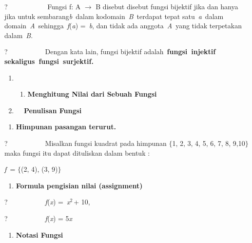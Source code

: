 \documentclass[11pt,fleqn]{book} %
\begin{document}
\noindent 

\noindent ?~~~~~~~~~~~ Fungsi f: A $\mathrm{\to}$ B disebut disebut fungsi bijektif jika dan hanya jika untuk sembarang\textit{b}~dalam kodomain~\textit{B}~terdapat tepat satu~\textit{a}~dalam domain~\textit{A}~sehingga~\textit{f}(\textit{a}) =~\textit{b}, dan tidak ada anggota~\textit{A}~yang tidak terpetakan dalam~\textit{B}.

\noindent ?~~~~~~~~~~~Dengan kata lain, fungsi bijektif adalah~\textbf{fungsi~injektif sekaligus~fungsi~surjektif.}

\noindent \textbf{}

\noindent \textbf{}

\begin{enumerate}
\item \begin{enumerate}
\item \textbf{ Menghitung Nilai dari Sebuah Fungsi}
\end{enumerate}

\item \textbf{ ~~Penulisan Fungsi}
\end{enumerate}

\noindent \textbf{}

\begin{enumerate}
\item \textbf{ Himpunan pasangan terurut.}
\end{enumerate}

\noindent 

\noindent ?~~~~~~~~~~~Misalkan fungsi kuadrat pada himpunan $\{$1, 2, 3, 4, 5, 6, 7, 8, 9,10$\}$ maka fungsi itu dapat dituliskan dalam bentuk :

\noindent \textit{f~}= $\{$(2, 4), (3, 9)$\}$

\noindent 

\begin{enumerate}
\item  \textbf{Formula pengisian nilai (assignment)}
\end{enumerate}

\noindent \textbf{}

\noindent ?~~~~~~~~~~~\textit{f}(\textit{x}) =~\textit{x}${}^{2~}$+ 10,

\noindent 

\noindent ?~~~~~~~~~~~\textit{f}(\textit{x}) = 5\textit{x}

\noindent \textit{}

\begin{enumerate}
\item \textit{ }\textbf{ Notasi Fungsi}
\end{enumerate}
\end{document}
